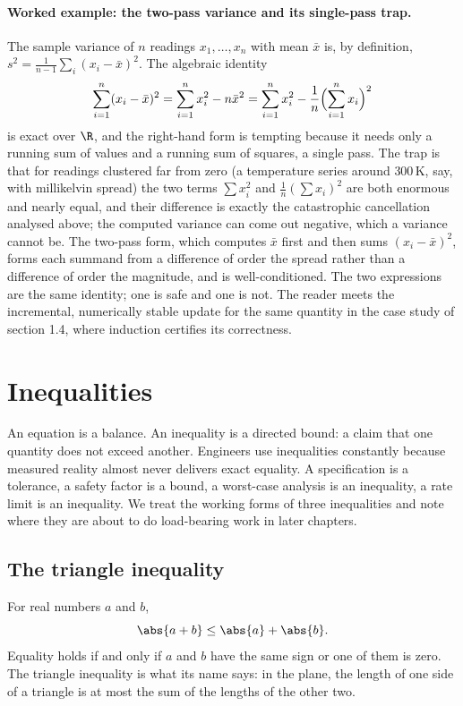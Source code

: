 \paragraph{Worked example: the two-pass variance and its single-pass
trap.} The sample variance of $n$ readings $x_{1}, \ldots, x_{n}$ with
mean $\bar x$ is, by definition, $s^{2} = \frac{1}{n - 1} \sum_{i}
(x_{i} - \bar x)^{2}$. The algebraic identity
\[
\sum_{i=1}^{n} (x_{i} - \bar x)^{2}
= \sum_{i=1}^{n} x_{i}^{2} - n \bar x^{2}
= \sum_{i=1}^{n} x_{i}^{2}
- \frac{1}{n}\Bigl(\sum_{i=1}^{n} x_{i}\Bigr)^{2}
\]
is exact over $\R$, and the right-hand form is tempting because it needs
only a running sum of values and a running sum of squares, a single
pass. The trap is that for readings clustered far from zero (a
temperature series around $300\,\si{\kelvin}$, say, with millikelvin
spread) the two terms $\sum x_{i}^{2}$ and $\frac{1}{n}(\sum x_{i})^{2}$
are both enormous and nearly equal, and their difference is exactly the
catastrophic cancellation analysed above; the computed variance can come
out negative, which a variance cannot be. The two-pass form, which
computes $\bar x$ first and then sums $(x_{i} - \bar x)^{2}$, forms each
summand from a difference of order the spread rather than a difference
of order the magnitude, and is well-conditioned. The two expressions
are the same identity; one is safe and one is not. The reader meets the
incremental, numerically stable update for the same quantity in the case
study of section 1.4, where induction certifies its correctness.

\section{Inequalities}

An equation is a balance. An inequality is a directed bound: a claim
that one quantity does not exceed another. Engineers use inequalities
constantly because measured reality almost never delivers exact
equality. A specification is a tolerance, a safety factor is a bound,
a worst-case analysis is an inequality, a rate limit is an
inequality. We treat the working forms of three inequalities and
note where they are about to do load-bearing work in later chapters.

\subsection{The triangle inequality}

For real numbers $a$ and $b$,
\[
\abs{a + b} \leq \abs{a} + \abs{b}.
\]
Equality holds if and only if $a$ and $b$ have the same sign or one
of them is zero. The triangle inequality is what its name says: in
the plane, the length of one side of a triangle is at most the sum
of the lengths of the other two.

